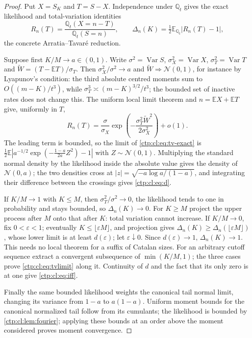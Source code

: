 \documentclass[11pt,a4paper]{article}
\numberwithin{equation}{section}
\theoremstyle{definition}
\theoremstyle{remark}
\DeclareMathOperator{\Var}{Var}
\newcommand{\E}{\mathbb E}
\newcommand{\Q}{\mathbb Q}
\newcommand{\Normal}{\mathcal N}
\begin{document}
\begin{proof}
Put $X=S_K$ and $T=S-X$. Independence under $\Q_t$ gives the exact
likelihood and total-variation identities
\begin{equation}\label{ctp:cl:eq:tv-exact}
 R_n(T)=\frac{\Q_t(X=n-T)}{\Q_t(S=n)},\qquad
 \Delta_n(K)=\tfrac12\E_{\Q_t}|R_n(T)-1|,
\end{equation}
the concrete Arratia--Tavar\'e reduction.

Suppose first $K/M\to a\in(0,1)$. Write $\sigma^2=\Var S$,
$\sigma_X^2=\Var X$, $\sigma_T^2=\Var T$ and $\widetilde W=(T-\E T)/\sigma_T$.
Then $\sigma_X^2/\sigma^2\to a$ and $\widetilde W\Rightarrow\Normal(0,1)$, for
instance by Lyapunov's condition: the third absolute centred moments sum to
$O((m-K)/t^3)$, while $\sigma_T^3\asymp(m-K)^{3/2}/t^3$; the bounded set of
inactive rates does not change this. The uniform local limit theorem and
$n=\E X+\E T$ give, uniformly in $T$,
\[
 R_n(T)=\frac\sigma{\sigma_X}\exp\!\left(-\frac{\sigma_T^2\widetilde W^2}{2\sigma_X^2}\right)+o(1).
\]
The leading term is bounded, so the limit of \eqref{ctp:cl:eq:tv-exact} is
$\frac12\E|a^{-1/2}\exp(-\frac{1-a}{2a}Z^2)-1|$ with $Z\sim\Normal(0,1)$.
Multiplying the standard normal density by the likelihood inside the
absolute value gives the density of $\Normal(0,a)$; the two densities cross
at $|z|=\sqrt{-a\log a/(1-a)}$, and integrating their difference between
the crossings gives \eqref{ctp:cl:eq:d}.

If $K/M\to1$ with $K\le M$, then $\sigma_T^2/\sigma^2\to0$, the likelihood
tends to one in probability and stays bounded, so $\Delta_n(K)\to0$. For
$K\ge M$ project the upper process after $M$ onto that after $K$: total
variation cannot increase. If $K/M\to0$, fix $0<\varepsilon<1$; eventually
$K\le\lfloor\varepsilon M\rfloor$, and projection gives
$\Delta_n(K)\ge\Delta_n(\lfloor\varepsilon M\rfloor)$, whose lower limit is
at least $d(\varepsilon)$; let $\varepsilon\downarrow0$. Since
$d(\varepsilon)\to1$, $\Delta_n(K)\to1$. This needs no local theorem for a
suffix of Catalan sizes. For an arbitrary cutoff sequence extract a
convergent subsequence of $\min(K/M,1)$; the three cases prove
\eqref{ctp:cl:eq:tvlimit} along it. Continuity of $d$ and the fact that its
only zero is at one give \eqref{ctp:cl:eq:iff}.

Finally the same bounded likelihood weights the canonical tail normal
limit, changing its variance from $1-a$ to $a(1-a)$. Uniform moment bounds
for the canonical normalized tail follow from its cumulants; the likelihood
is bounded by \cref{ctp:cl:lem:fourier}; applying these bounds at an order
above the moment considered proves moment convergence.
\end{proof}
\end{document}
